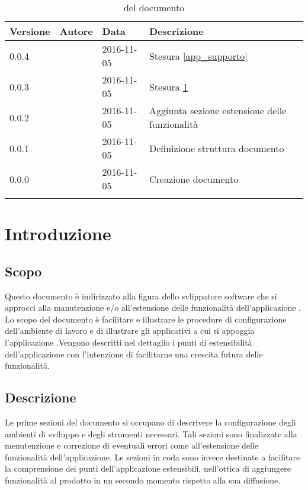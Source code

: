 \documentclass[12pt,a4paper]{article}
\begin{document}
	\begin{center}
		\begin{longtable}[H]{p{} p{} p{} p{}}
			\toprule
			\textbf{Versione}	&	\textbf{Autore}	&	\textbf{Data}	&	\textbf{Descrizione}\\*
			\midrule
			
			0.0.4 & \AB{} & 2016-11-05 &  Stesura \ref{app_supporto}    \\*
			\midrule

			0.0.3 & \AB{} & 2016-11-05 &  Stesura \ref{intro}    \\*

			\midrule
			0.0.2 & \AVI{} & 2016-11-05 &  Aggiunta sezione estensione delle funzionalità \\*

			\midrule
			0.0.1 & \AB{} & 2016-11-05 &  Definizione struttura documento \\*
			\midrule
			0.0.0 & \AB{} & 2016-11-05 &  Creazione documento \\*

			\bottomrule
			\caption{\mGls{versionamento}  del documento}
			\label{tabVers1}
		\end{longtable}
	\end{center}
	
	\newpage
	\tableofcontents
	\newpage
	\listoftables
	\listoffigures
	\newpage
	
	
	\section{Introduzione}	\label{intro}
	
	\subsection{Scopo}
	Questo documento è indirizzato alla figura dello svlippatore software che si approcci alla manutenzione e/o all'estensione delle funzionalità dell'applicazione \prj{}.
	Lo scopo del documento è facilitare e illustrare le procedure di configurazione dell'ambiente di lavoro e di illustrare gli applicativi a cui si appoggia l'applicazione \prj{}.Vengono descritti nel dettaglio i punti di estensibilità dell'applicazione con l'intenzione di facilitarne una crescita futura delle funzionalità.
	
	\subsection{Descrizione}
	Le prime sezioni del documento si occupano di descrivere la configurazione degli ambienti di sviluppo e degli strumenti necessari. Tali sezioni sono finalizzate alla menutenzione e correzione di eventuali errori come all'estensione delle funzionalità dell'applicazione. Le sezioni in coda sono invece destinate a facilitare la comprensione dei punti dell'applicazione estensibili, nell'ottica di aggiungere funzionalità al prodotto in un secondo momento rispetto alla sua diffusione.
	
\end{document}
